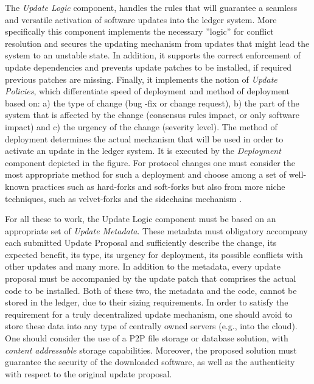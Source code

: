 
The \emph{Update Logic} component, handles the rules that will guarantee a seamless and versatile activation of software updates into the ledger system. More specifically this component implements the necessary ''logic'' for conflict resolution and secures the updating mechanism from updates that might lead the system to an unstable state. In addition, it supports the correct enforcement of update dependencies and prevents update patches to be installed, if required previous patches are missing. Finally, it implements the notion of \emph{Update Policies}, which differentiate speed of deployment and method of deployment based on: a) the type of change (bug -fix or change request), b) the part of the system that is affected by the change (consensus rules impact, or only software impact) and c) the urgency of the change (severity level). The method of deployment determines the actual mechanism that will be used in order to activate an update in the ledger system. It is executed by the \emph{Deployment} component depicted in the figure. For protocol changes one must consider the most appropriate method for such a deployment and choose among a set of well-known practices such as hard-forks and soft-forks but also from more niche techniques, such as velvet-forks \cite{velvet} and the sidechains mechanism \cite{sidechains}.


For all these to work, the Update Logic component must be based on an appropriate set of \emph{Update Metadata}. These metadata must obligatory accompany each submitted Update Proposal and sufficiently describe the change, its expected benefit, its type, its urgency for deployment, its possible conflicts with other updates and many more. In addition to the metadata, every update proposal must be accompanied by the update patch that comprises the actual code to be installed. Both of these two, the metadata and the code, cannot be stored in the ledger, due to their sizing requirements. In order to satisfy the requirement for a truly decentralized update mechanism, one should avoid to store these data into any type of centrally owned servers (e.g., into the cloud). One should consider the use of a P2P file storage or database solution, with \emph{content addressable} \cite{content-addressable} storage capabilities. Moreover, the proposed solution  must guarantee the security of the downloaded software, as well as the authenticity with respect to the original update proposal.
